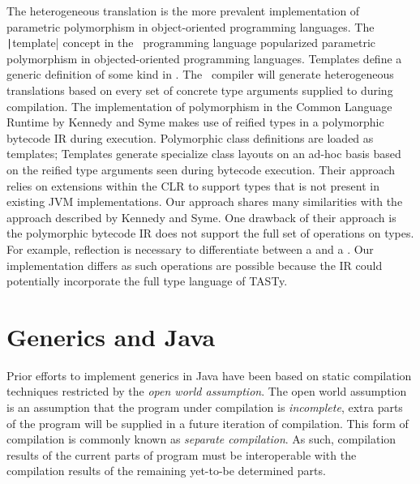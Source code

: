 The heterogeneous translation is the more prevalent implementation of parametric polymorphism in object-oriented programming languages.
The \texttt|template| concept in the \CC\ programming language popularized parametric polymorphism in objected-oriented programming languages.
Templates define a generic definition of some kind in \CC.
The \CC\ compiler will generate heterogeneous translations based on every set of concrete type arguments supplied to during compilation.
The implementation of polymorphism in the Common Language Runtime\cite{clr:overview}\cite{clr:spec} by Kennedy and Syme makes use of reified types in a polymorphic bytecode IR during execution.
Polymorphic class definitions are loaded as templates; Templates generate specialize class layouts on an ad-hoc basis based on the reified type arguments seen during bytecode execution.
Their approach relies on extensions within the CLR to support types that is not present in existing JVM implementations.
Our approach shares many similarities with the approach described by Kennedy and Syme.
One drawback of their approach is the polymorphic bytecode IR does not support the full set of operations on types.
For example, reflection is necessary to differentiate between a  and a .
Our implementation differs as such operations are possible because the IR could potentially incorporate the full type language of TASTy.
 

\section{Generics and Java}

Prior efforts to implement generics in Java have been based on static compilation techniques restricted by the \textit{open world assumption}.
The open world assumption is an assumption that the program under compilation is \textit{incomplete}, extra parts of the program will be supplied in a future iteration of compilation.
This form of compilation is commonly known as \textit{separate compilation}.
As such, compilation results of the current parts of program must be interoperable with the compilation results of the remaining yet-to-be determined parts.

